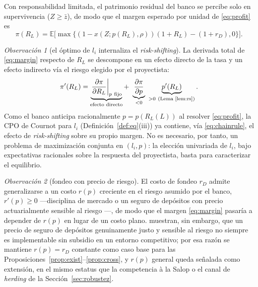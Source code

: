 \documentclass[11pt]{article}
\theoremstyle{plain}
\theoremstyle{definition}
\theoremstyle{remark}
\newtheorem{remark}{Observación}
\newcommand{\E}{\mathbb{E}}
\newcommand{\1}{\mathbf{1}}
\begin{document}
Con responsabilidad limitada, el patrimonio residual del banco se percibe solo en supervivencia
($Z\ge\bar z$), de modo que el margen esperado por unidad de \eqref{eq:profit} es
\begin{equation}
\pi(R_L)=\E\!\big[\max\{(1-x(Z;p(R_L),\rho))(1+R_L)-(1+r_D),0\}\big].
\label{eq:margin}
\end{equation}

\begin{remark}[el óptimo de $l_i$ internaliza el \textit{risk-shifting}]\label{rem:chain}
La derivada total de \eqref{eq:margin} respecto de $R_L$ se descompone en un efecto directo de
la tasa y un efecto indirecto vía el riesgo elegido por el proyectista:
\begin{equation}
\pi'(R_L)=\underbrace{\left.\frac{\partial \pi}{\partial R_L}\right|_{p\ \text{fijo}}}_{\text{efecto directo}}
+\ \underbrace{\frac{\partial \pi}{\partial p}}_{<0}\ \underbrace{p'(R_L)}_{>0\ (\text{Lema~\ref{lem:rs}})}.
\label{eq:chainrule}
\end{equation}
Como el banco anticipa racionalmente $p=p(R_L(L))$ al resolver \eqref{eq:profit}, la CPO de
Cournot para $l_i$ (Definición~\ref{def:eq}(iii)) ya contiene, vía \eqref{eq:chainrule}, el
efecto de \textit{risk-shifting} sobre su propio margen. No es necesario, por tanto, un problema
de maximización conjunta en $(l_i,p)$: la elección univariada de $l_i$, bajo expectativas
racionales sobre la respuesta del proyectista, basta para caracterizar el equilibrio.
\end{remark}

\begin{remark}[fondeo con precio de riesgo]\label{rem:riskfunding}
El costo de fondeo $r_D$ admite generalizarse a un costo $r(p)$ creciente en el riesgo asumido
por el banco, $r'(p)\ge 0$ —disciplina de mercado o un seguro de depósitos con precio
actuarialmente sensible al riesgo \citep{Merton1977}—, de modo que el margen \eqref{eq:margin}
pasaría a depender de $r(p)$ en lugar de un costo plano. \citet{ChanGreenbaumThakor1992}
muestran, sin embargo, que un precio de seguro de depósitos genuinamente justo y sensible al
riesgo no siempre es implementable sin subsidio en un entorno competitivo; por esa razón se
mantiene $r(p)=r_D$ constante como caso base para las Proposiciones~\ref{prop:exist}--\ref{prop:cross},
y $r(p)$ general queda señalada como extensión, en el mismo estatus que la competencia à la
Salop o el canal de \textit{herding} de la Sección~\ref{sec:robustez}.
\end{remark}
\end{document}
